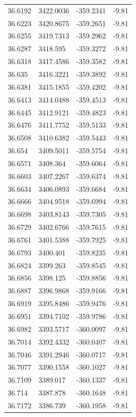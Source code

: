 \begin{table}[H]
\begin{tabular}{llll}
36.6192 & 3422.0036 & -359.2341 & -9.81 \\
36.6223 & 3420.8675 & -359.2651 & -9.81 \\
36.6255 & 3419.7313 & -359.2962 & -9.81 \\
36.6287 & 3418.595 & -359.3272 & -9.81 \\
36.6318 & 3417.4586 & -359.3582 & -9.81 \\
36.635 & 3416.3221 & -359.3892 & -9.81 \\
36.6381 & 3415.1855 & -359.4202 & -9.81 \\
36.6413 & 3414.0488 & -359.4513 & -9.81 \\
36.6445 & 3412.9121 & -359.4823 & -9.81 \\
36.6476 & 3411.7752 & -359.5133 & -9.81 \\
36.6508 & 3410.6382 & -359.5443 & -9.81 \\
36.654 & 3409.5011 & -359.5754 & -9.81 \\
36.6571 & 3408.364 & -359.6064 & -9.81 \\
36.6603 & 3407.2267 & -359.6374 & -9.81 \\
36.6634 & 3406.0893 & -359.6684 & -9.81 \\
36.6666 & 3404.9518 & -359.6994 & -9.81 \\
36.6698 & 3403.8143 & -359.7305 & -9.81 \\
36.6729 & 3402.6766 & -359.7615 & -9.81 \\
36.6761 & 3401.5388 & -359.7925 & -9.81 \\
36.6793 & 3400.401 & -359.8235 & -9.81 \\
36.6824 & 3399.263 & -359.8545 & -9.81 \\
36.6856 & 3398.125 & -359.8856 & -9.81 \\
36.6887 & 3396.9868 & -359.9166 & -9.81 \\
36.6919 & 3395.8486 & -359.9476 & -9.81 \\
36.6951 & 3394.7102 & -359.9786 & -9.81 \\
36.6982 & 3393.5717 & -360.0097 & -9.81 \\
36.7014 & 3392.4332 & -360.0407 & -9.81 \\
36.7046 & 3391.2946 & -360.0717 & -9.81 \\
36.7077 & 3390.1558 & -360.1027 & -9.81 \\
36.7109 & 3389.017 & -360.1337 & -9.81 \\
36.714 & 3387.878 & -360.1648 & -9.81 \\
36.7172 & 3386.739 & -360.1958 & -9.81 \\

\end{tabular}
\end{table}
